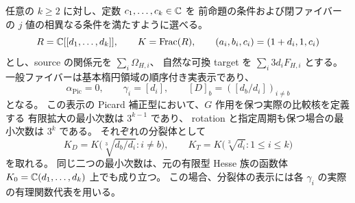 \begin{corollary}[独立な境界位相と最小分裂次数]
\label{mbpd:cor:phase-independence}
任意の $k\geq2$ に対し、定数 $c_1,\ldots,c_k\in\mathbb C$ を
前命題の条件および閉ファイバーの $j$ 値の相異なる条件を満たすように選べる。
\[
 R=\mathbb C[[d_1,\ldots,d_k]],\qquad K=\operatorname{Frac}(R),
 \qquad (a_i,b_i,c_i)=(1+d_i,1,c_i)
\]
とし、source の関係元を $\sum_i\Omega_{H,i}$、
自然な可換 target を $\sum_i3d_iF_{H,i}$ とする。
一般ファイバーは基本楕円領域の順序付き実表示であり、
\[
 \alpha_{\mathrm{Pic}}=0,\qquad
 \gamma_i=[d_i],\qquad
 [D]_b=([d_b/d_i])_{i\ne b}
\]
となる。
この表示の Picard 補正型において、$G$ 作用を保つ実際の比較核を定義する
有限拡大の最小次数は $3^{k-1}$ であり、
rotation と指定周期も保つ場合の最小次数は $3^k$ である。
それぞれの分裂体として
\begin{equation}\label{mbpd:eq:sharp-phase-fields}
 K_D=K\bigl(\sqrt[3]{d_b/d_i}:i\ne b\bigr),
 \qquad K_T=K\bigl(\sqrt[3]{d_i}:1\leq i\leq k\bigr)
\end{equation}
を取れる。
同じ二つの最小次数は、元の有限型 Hesse 族の函数体
$K_0=\mathbb C(d_1,\ldots,d_k)$ 上でも成り立つ。
この場合、分裂体の表示には各 $\gamma_i$ の実際の有理関数代表を用いる。
\end{corollary}
